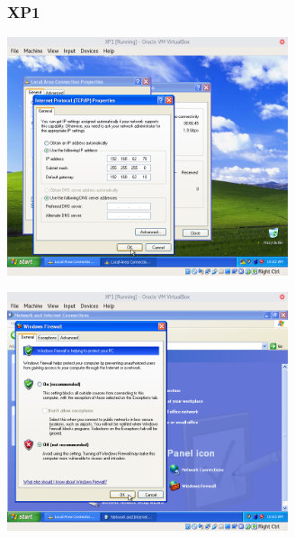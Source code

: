 \subsubsection*{XP1}
\includegraphics[height=7cm]{img/WinXPNetworkConfiguration.png}\par
\includegraphics[height=7cm]{img/WinXPFirewallDisabled.png}\par